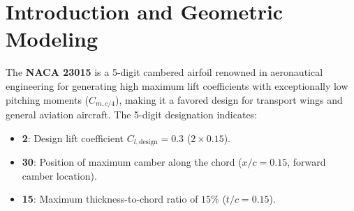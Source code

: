 \documentclass[11pt,a4paper]{article}
\begin{document}
\hypersetup{pageanchor=true}

\begin{abstract}
\noindent This report presents a comprehensive numerical simulation and aerodynamic analysis of external incompressible flow past a 2D \textbf{NACA 23015} airfoil. The simulation was performed in \textbf{ANSYS Fluent 2019 R1} using a structured C-grid computational topology. A systematic grid convergence study was conducted across three spatial resolutions (coarse: 7,800 elements; medium: 81,300 elements; fine: 199,500 elements), demonstrating that the medium mesh achieves asymptotic grid independence with a lift coefficient deviation of only $1.3\%$ relative to the fine grid. Aerodynamic lift and drag coefficients at an angle of attack $\alpha = 6^\circ$ were validated against empirical wind tunnel polar data from Abbott \& von Doenhoff ($C_l = 0.612$ vs. $\approx 0.70$). Comparative analyses were conducted between laminar and turbulent ($k\text{-}\omega\text{ SST}$) regimes at $\alpha = 10^\circ$, demonstrating that absent turbulent momentum diffusion, laminar flow experiences premature boundary layer separation, resulting in stall and severe drag escalation. Furthermore, detailed flow field contours (static pressure, dynamic pressure, velocity magnitude, vorticity, streamlines, and surface pressure coefficients $C_p$) are evaluated at $\alpha = 6^\circ$ and $\alpha = 10^\circ$, elucidating boundary layer growth, adverse pressure gradient effects, and incipient separation mechanisms.
\end{abstract}

\vspace{0.8cm}
\tableofcontents
\newpage


\section{Introduction and Geometric Modeling}
The \textbf{NACA 23015} is a 5-digit cambered airfoil renowned in aeronautical engineering for generating high maximum lift coefficients with exceptionally low pitching moments ($C_{m,c/4}$), making it a favored design for transport wings and general aviation aircraft. The 5-digit designation indicates:
\begin{itemize}
    \item \textbf{2}: Design lift coefficient $C_{l,\text{design}} = 0.3$ ($2 \times 0.15$).
    \item \textbf{30}: Position of maximum camber along the chord ($x/c = 0.15$, forward camber location).
    \item \textbf{15}: Maximum thickness-to-chord ratio of $15\%$ ($t/c = 0.15$).
\end{itemize}
\end{document}
